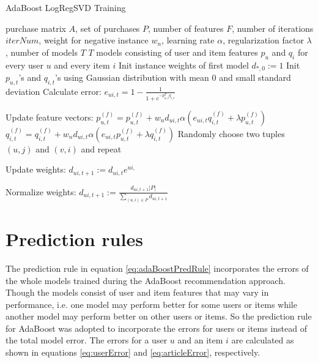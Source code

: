 \documentclass[10pt]{reportMaster}
\begin{document}
\begin{algorithm}
	\caption{AdaBoost LogRegSVD Training}
	\label{alg:AdaBoostLogRegSVDTraining}
	\begin{algorithmic}[1]
		\Require purchase matrix $A$, set of purchases $P$, number of features $F$, number of iterations $iterNum$, weight for negative instance $w_n$, learning rate $\alpha$, regularization factor $\lambda$, number of models $T$
		\Ensure $T$ models consisting of user and item features $p_u$ and $q_i$ for every user $u$ and every item $i$
		\State Init instance weights of first model $d_{*,0} := 1$
				\State Init $p_{u,t}$'s and $q_{i,t}$'s using Gaussian distribution with mean $0$ and small standard deviation
					\State Calculate error:
					\State $e_{ui,t} = 1 - \frac{1}{1 + e^{-p_{u,t}^Tq_{i,t}}}$
					
					\State Update feature vectors:
						\State $p_{u,t}^{(f)} = p_{u,t}^{(f)} + w_n d_{ui,t} \alpha (e_{ui, t} q_{i,t}^{(f)} + \lambda p_{u,t}^{(f)})$
						\State $q_{i,t}^{(f)} = q_{i,t}^{(f)} + w_n d_{ui,t} \alpha (e_{ui, t} p_{u,t}^{(f)} + \lambda q_{i,t}^{(f)})$
					\EndFor	
					\State Randomly choose two tuples $(u,j)$ and $(v,i)$ and repeat
				\EndFor
			\EndFor
			
			\State Update weights:
				\State $d_{ui,t+1} := d_{ui,t} e^{ui,}$
			\EndFor
			
			\State Normalize weights:
			\State $d_{ui,t+1} := \frac{d_{ui,t+1} |P|}{\sum_{(u,i) \in P}{d_{ui, t+1}}}$
			\EndFor 
		\EndFor
		
		
	\end{algorithmic}	
\end{algorithm}


\section{Prediction rules}
\label{sec:predictionRules}

The prediction rule in equation \ref{eq:adaBoostPredRule} incorporates the errors of the whole models trained during the AdaBoost recommendation approach.
Though the models consist of user and item features that may vary in performance, i.e. one model may perform better for some users or items while another model may perform better on other users or items.
So the prediction rule for AdaBoost was adopted to incorporate the errors for users or items instead of the total model error.
The errors for a user $u$ and an item $i$ are calculated as shown in equations \ref{eq:userError} and \ref{eq:articleError}, respectively.
\end{document}

